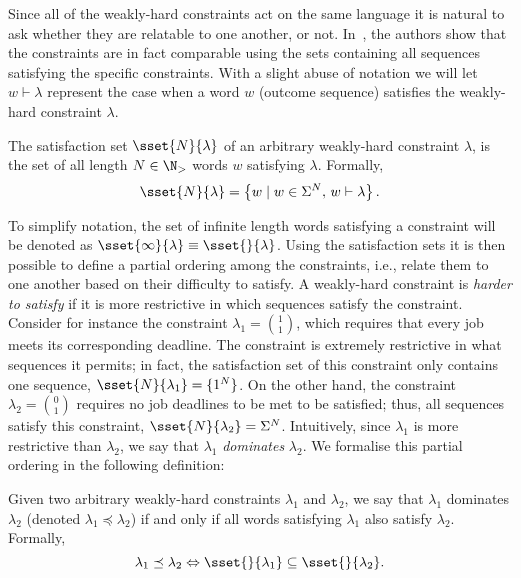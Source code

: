 Since all of the weakly-hard constraints act on the same language it is natural to ask whether they are relatable to one another, or not.
In~\cite{Bernat:2001}, the authors show that the constraints are in fact comparable using the sets containing all sequences satisfying the specific constraints.
With a slight abuse of notation we will let $w \vdash \lambda$ represent the case when a word $w$ (outcome sequence) satisfies the weakly-hard constraint $\lambda$.
%
\begin{definition}
    The satisfaction set $\sset{N}{\lambda}$ of an arbitrary weakly-hard constraint $\lambda$, is the set of all length $N \in \N_{>}$ words $w$ satisfying $\lambda$.
    Formally,
    \begin{equation*}
        \sset{N}{\lambda} = \left\{ w \mid w \in \Sigma^N,\, w \vdash \lambda \right\}.
    \end{equation*}
\end{definition}
%
To simplify notation, the set of infinite length words satisfying a constraint will be denoted as $\sset{\infty}{\lambda} \equiv \sset{}{\lambda}$.
Using the satisfaction sets it is then possible to define a partial ordering among the constraints, i.e., relate them to one another based on their difficulty to satisfy.
A weakly-hard constraint is \emph{harder to satisfy} if it is more restrictive in which sequences satisfy the constraint.
Consider for instance the constraint $\lambda_1 = \binom{1}{1}$, which requires that every job meets its corresponding deadline.
The constraint is extremely restrictive in what sequences it permits; in fact, the satisfaction set of this constraint only contains one sequence, $\sset{N}{\lambda_1} = \{ 1^N \}$.
On the other hand, the constraint $\lambda_2 = \binom{0}{1}$ requires no job deadlines to be met to be satisfied; thus, all sequences satisfy this constraint, $\sset{N}{\lambda_2} = \Sigma^N$.
Intuitively, since $\lambda_1$ is more restrictive than $\lambda_2$, we say that $\lambda_1$ \emph{dominates} $\lambda_2$.
We formalise this partial ordering in the following definition:
%
\begin{definition}%
    \label{def:kappa:dominance}%
    Given two arbitrary weakly-hard constraints $\lambda_1$ and $\lambda_2$, we say that $\lambda_1$ dominates $\lambda_2$ (denoted $\lambda_1 \preceq \lambda_2$) if and only if all words satisfying $\lambda_1$ also satisfy $\lambda_2$.
    Formally,
    \begin{equation*}
        \lambda_1 \preceq \lambda_2 \Leftrightarrow \sset{}{\lambda_1} \subseteq \sset{}{\lambda_2}.
    \end{equation*}
\end{definition}
